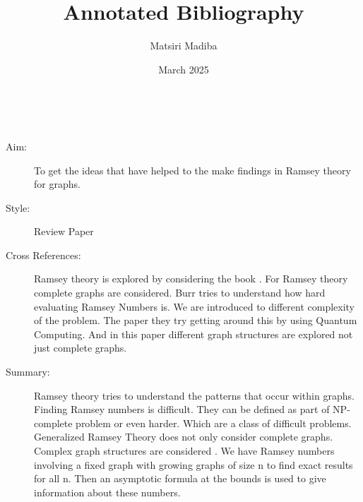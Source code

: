 \documentclass{Assignment}
\author{Matsiri Madiba}
\date{March 2025}
\title{Annotated Bibliography}
\begin{document}
\maketitle
\cite{burr1981generalized}~
\begin{description}
	\item[Aim:]
To get the ideas that have helped to the make findings in Ramsey theory for graphs.
\item[Style:]
Review Paper
\item[Cross References:]
Ramsey theory is explored by considering the book \cite{graham1980ramsey}.
For Ramsey theory complete graphs are considered. 
Burr tries to understand how hard evaluating Ramsey Numbers is.
We are introduced to different complexity of the problem.
The paper \cite{PhysRevA.93.032301} they try getting around this by using Quantum Computing.
And in this paper different graph structures are explored not just complete graphs.
\item [Summary:]
Ramsey theory tries to understand the patterns that occur within graphs.
Finding Ramsey numbers is difficult.
They can be defined as part of NP-complete problem or even harder.
Which are a class of difficult problems.
Generalized Ramsey Theory does not only consider complete graphs.
Complex graph structures are considered .
We have Ramsey numbers involving a fixed graph with growing graphs of size n to find exact results for all n. 
Then an asymptotic formula at the bounds is used to give information about these numbers.  
\end{description}
\end{document}
